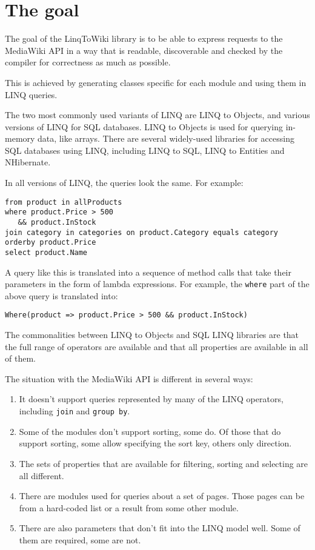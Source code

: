 \chapter{The goal}
\label{goal}

The goal of the LinqToWiki library is to be able to express requests to the MediaWiki API
in a way that is readable, discoverable and checked by the compiler for correctness as much as possible.

This is achieved by generating classes specific for each module and using them in LINQ queries.

The two most commonly used variants of LINQ are LINQ to Objects, and various versions of LINQ for SQL databases.
LINQ to Objects is used for querying in-memory data, like arrays.
There are several widely-used libraries for accessing SQL databases using LINQ, including LINQ to SQL, LINQ to Entities and NHibernate.

In all versions of LINQ, the queries look the same. For example:

\begin{lstlisting}
from product in allProducts
where product.Price > 500
   && product.InStock
join category in categories on product.Category equals category
orderby product.Price
select product.Name
\end{lstlisting}

A query like this is translated into a sequence of method calls that take their parameters in the form of lambda expressions.
For example, the \lstinline{where} part of the above query is translated into:

\begin{lstlisting}
Where(product => product.Price > 500 && product.InStock)
\end{lstlisting}

The commonalities between LINQ to Objects and SQL LINQ libraries are that the full range of operators are available
and that all properties are available in all of them.

The situation with the MediaWiki API is different in several ways:

\begin{enumerate}
\item It doesn't support queries represented by many of the LINQ operators, including \lstinline{join} and \lstinline{group by}.
\item Some of the modules don't support sorting, some do. Of those that do support sorting, some allow specifying the sort key, others only direction.
\item The sets of properties that are available for filtering, sorting and selecting are all different.
\item There are modules used for queries about a set of pages. Those pages can be from a hard-coded list or a result from some other module.
\item There are also parameters that don't fit into the LINQ model well. Some of them are required, some are not.
\end{enumerate}

